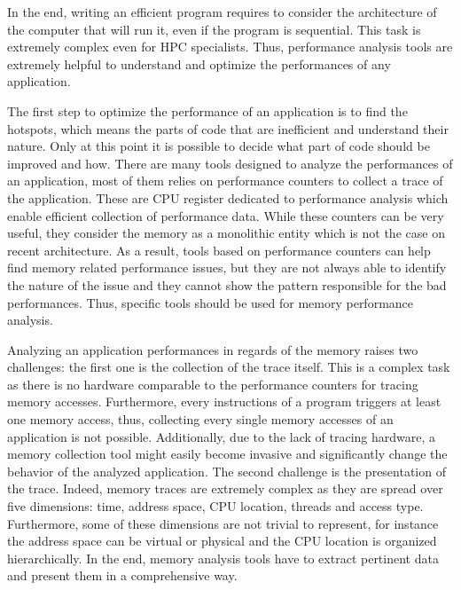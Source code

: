 In the end, writing an efficient program requires to consider the architecture of the computer that will run it, even if the program is sequential.
This task is extremely complex even for \gls{HPC} specialists.
Thus, performance analysis tools are extremely helpful to understand and optimize the performances of any application.

The first step to optimize the performance of an application is to find the hotspots, which means the parts of code that are inefficient and understand their nature.
Only at this point it is possible to decide what part of code should be improved and how.
There are many tools designed to analyze the performances of an application, most of them relies on performance counters to collect a trace of the application.
These are \gls{CPU} register dedicated to performance analysis which enable efficient collection of performance data.
While these counters can be very useful, they consider the memory as a monolithic entity which is not the case on recent architecture.
As a result, tools based on performance counters can help find memory related performance issues, but they are not always able to identify the nature of the issue and they cannot show the pattern responsible for the bad performances.
Thus, specific tools should be used for memory performance analysis.

Analyzing an application performances in regards of the memory raises two challenges: the first one is the collection of the trace itself.
This is a complex task as there is no hardware comparable to the performance counters for tracing memory accesses.
Furthermore, every instructions of a program triggers at least one memory access, thus, collecting every single memory accesses of an application is not possible.
Additionally, due to the lack of tracing hardware, a memory collection tool might easily become invasive and significantly change the behavior of the analyzed application.
The second challenge is the presentation of the trace.
Indeed, memory traces are extremely complex as they are spread over five dimensions: time, address space, \gls{CPU} location, threads and access type.
Furthermore, some of these dimensions are not trivial to represent, for instance the address space can be virtual or physical and the \gls{CPU} location is organized hierarchically.
In the end, memory analysis tools have to extract pertinent data and present them in a comprehensive way.


